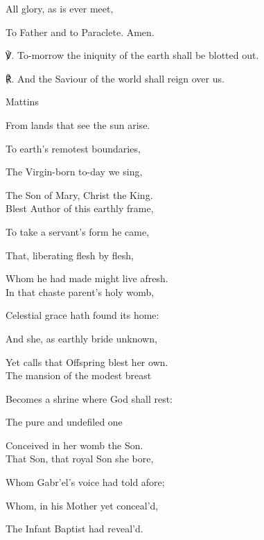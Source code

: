 \begin{paracol}{2}[]
\begin{hangparas}{1.25em}{1}
All glory, as is ever meet,

To Father and to Paraclete. Amen.\\
\end{hangparas}

℣. To-morrow the iniquity of the earth shall be blotted out.

℟. And the Saviour of the world shall reign over us.


\switchcolumn

\begin{inhead}
	Mattins
\end{inhead}

\begin{hangparas}{1.25em}{1}

From lands that see the sun arise.

To earth's remotest boundaries,

The Virgin-born to-day we sing,

The Son of Mary, Christ the King.\\

Blest Author of this earthly frame,

To take a servant's form he came,

That, liberating flesh by flesh,

Whom he had made might live afresh.\\

In that chaste parent's holy womb,

Celestial grace hath found its home:

And she, as earthly bride unknown,

Yet calls that Offspring blest her own.\\

The mansion of the modest breast

Becomes a shrine where God shall rest:

The pure and undefiled one

Conceived in her womb the Son.\\

That Son, that royal Son she bore,

Whom Gabr'el's voice had told afore;

Whom, in his Mother yet conceal'd,

The Infant Baptist had reveal'd.\\


\end{hangparas}
\end{paracol}
